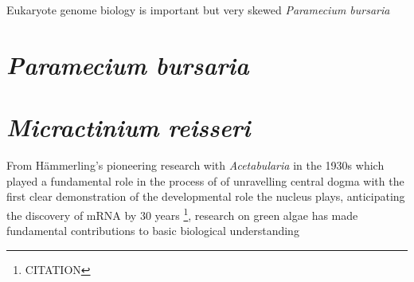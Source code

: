 Eukaryote genome biology is important but very skewed \citep{DelCampo2014}
\textit{Paramecium bursaria} 


\section{\textit{Paramecium bursaria}}

\citep{Corliss1974} 

%
%
%
%
%


\section{\textit{Micractinium reisseri}}
From H\"ammerling's pioneering research with \textit{Acetabularia} in the 1930s 
which played a fundamental role in the process of 
of unravelling central dogma with the first clear demonstration of the 
developmental role the nucleus plays, anticipating the discovery of mRNA by 30 years
\footnote{CITATION}, research on green algae has made fundamental contributions
to basic biological understanding

